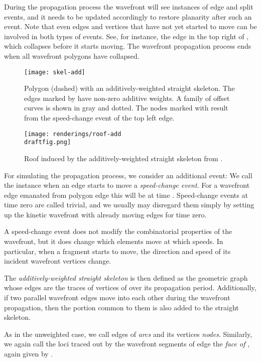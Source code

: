 \documentclass[preprint]{elsarticle}
\newcommand{\draftfig}{.small}
\begin{document}
During the propagation process the wavefront will see instances
of edge and split events, and it needs to be updated accordingly to restore
planarity after such an event.
Note that even edges and vertices that have not yet started to move can be
involved in both types of events. See, for instance, the edge in the top right
of , which collapses before it starts moving. The wavefront
propagation process ends when all wavefront polygons have collapsed.

\begin{figure}[htb!]
  \centering
  \texttt{[image: skel-add]}
    \caption{Polygon (dashed) with an additively-weighted straight skeleton.
       The edges marked by  have non-zero additive weights.
       A family of offset curves is shown in gray and dotted.
       The nodes marked with  result from the speed-change event
       of the top left edge.
     }
  \label{fig:skel-add}

  \texttt{[image: renderings/roof-add\\draftfig.png]}
    \caption{Roof induced by the additively-weighted straight skeleton from
       .
     }
  \label{fig:skel-add-roof}
\end{figure}

For simulating the propagation process, we consider an additional event:
We call the instance when an edge starts to move a \emph{speed-change event}.
For a wavefront edge emanated from polygon edge  this will be at time
.  Speed-change events at time zero are called trivial, and we
usually may disregard them simply by setting up the kinetic wavefront with
already moving edges for time zero.

A speed-change event does not modify the combinatorial properties of the
wavefront, but it does change which elements move at which speeds.  In
particular, when a fragment starts to move, the direction and speed of its
incident wavefront vertices change.

The \emph{additively-weighted straight skeleton}  is then
defined as the geometric graph whose edges are the traces of vertices of
 over its propagation period.  Additionally, if two
parallel wavefront edges move into each other during the wavefront propagation,
then the portion common to them is also added to the straight skeleton.


As in the unweighted case, we call edges of  \emph{arcs}
and its vertices \emph{nodes}.
Similarly, we again call the loci traced out by the wavefront
segments  of edge  the \emph{face  of }, again given by
.
\end{document}
